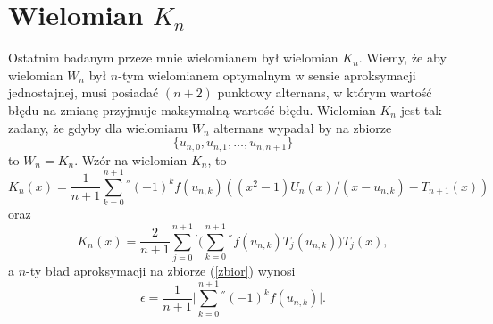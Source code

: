 \documentclass[11pt,wide]{mwart}
\begin{document}
\section{Wielomian $K_n$}
Ostatnim badanym przeze mnie wielomianem był wielomian $K_n$. Wiemy, że aby wielomian $W_n$ był $n$-tym wielomianem optymalnym w sensie aproksymacji jednostajnej, musi posiadać $(n+2)$ punktowy alternans, w którym wartość błędu na zmianę przyjmuje maksymalną wartość błędu. Wielomian $K_n$ jest tak zadany, że gdyby dla wielomianu $W_n$ alternans wypadał by na zbiorze
\begin{equation} \label{zbior}
\{u_{n, 0}, u_{n, 1}, \dots, u_{n, n+1}\}
\end{equation}
to $W_n = K_n$. Wzór na wielomian $K_n$, to
\begin{equation}
K_n(x) = \frac{1}{n+1} \sum_{k=0}^{n+1} {}^{''} (-1)^k f(u_{n,k}) ((x^2-1)U_n(x) / (x-u_{n,k}) - T_{n+1}(x))
\end{equation}
oraz
\begin{equation} \label{K2}
K_n(x) = \frac{2}{n+1} \sum_{j=0}^{n+1} {}^{'} \Big( \sum_{k=0}^{n+1} {}^{''} f(u_{n,k}) T_j(u_{n,k})\Big) T_j(x),
\end{equation}
a $n$-ty bład aproksymacji na zbiorze (\ref{zbior}) wynosi
\begin{equation}
\epsilon = \frac{1}{n+1} \Big| \sum_{k=0}^{n+1} {}^{''} (-1)^k f(u_{n,k}) \Big|.
\end{equation}
\end{document}

